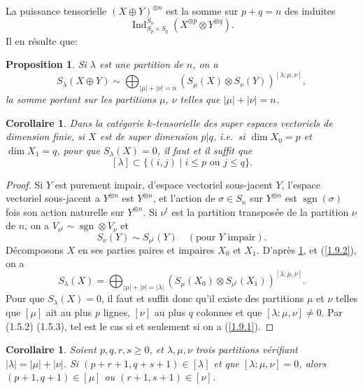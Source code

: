 \documentclass[11pt,a4paper]{article}
\theoremstyle{plain}
\newtheorem{proposition}[theorem]{Proposition}
\newtheorem{corollary}[theorem]{Corollaire}
\theoremstyle{definition}
\DeclareMathOperator{\Ind}{Ind}
\DeclareMathOperator{\sgn}{sgn}
\begin{document}
La puissance tensorielle $(X\oplus Y)^{\otimes n}$ est la somme sur $p+q=n$ des induites
\[
\Ind^{S_n}_{S_p\times S_q}(X^{\otimes p}\otimes Y^{\otimes q}).
\]
Il en r\'esulte que:

\begin{proposition}\label{1.8}
Si $\lambda$ est une partition de $n$, on a
\begin{equation}\label{1.8.1}
S_\lambda(X\oplus Y)\sim\bigoplus_{|\mu|+|\nu|=n}(S_\mu(X)\otimes S_\nu(Y))^{[\lambda:\mu,\nu]},
\end{equation}
la somme portant sur les partitions $\mu$, $\nu$ telles que $|\mu|+|\nu|=n$.
\end{proposition}

\begin{corollary}\label{1.9}
Dans la cat\'egorie $k$-tensorielle des super espaces vectoriels de dimension finie, si $X$ est de super dimension $p|q$, i.e.~si $\dim X_0=p$ et $\dim X_1=q$, pour que $S_\lambda(X)=0$, il faut et il suffit que
\begin{equation}\label{1.9.1}
[\lambda]\subset\{(i,j)\mid i\leq p\text{ ou }j\leq q\}.
\end{equation}
\end{corollary}

\begin{proof}
Si $Y$ est purement impair, d'espace vectoriel sous-jacent $Y$, l'espace vectoriel sous-jacent a $Y^{\otimes n}$ est $Y^{\otimes n}$, et l'action de $\sigma\in S_n$ sur $Y^{\otimes n}$ est $\sgn(\sigma)$ fois son action naturelle sur $Y^{\otimes n}$. Si $\nu^t$ est la partition transpos\'ee de la partition $\nu$ de $n$, on a $V_{\nu^t}\sim\sgn\otimes V_\nu$ et
\begin{equation}\label{1.9.2}
S_\nu(Y)\sim S_{\nu^t}(Y)\quad(\text{pour }Y\text{ impair}).
\end{equation}
D\'ecomposons $X$ en ses parties paires et impaires $X_0$ et $X_1$. D'apr\`es \ref{1.8}, et (\ref{1.9.2}), on a
\[
S_\lambda(X)=\bigoplus_{|\mu|+|\nu|=|\lambda|}(S_\mu(X_0)\otimes S_{\nu^t}(X_1))^{[\lambda:\mu,\nu]}.
\]
Pour que $S_\lambda(X)=0$, il faut et suffit donc qu'il existe des partitions $\mu$ et $\nu$ telles que $[\mu]$ ait au plus $p$ lignes, $[\nu]$ au plus $q$ colonnes et que $[\lambda:\mu,\nu]\neq0$. Par (1.5.2) (1.5.3), tel est le cas si et seulement si on a (\ref{1.9.1}).
\end{proof}

\begin{corollary}\label{1.10}
Soient $p,q,r,s\geq0$, et $\lambda,\mu,\nu$ trois partitions v\'erifiant $|\lambda|=|\mu|+|\nu|$. Si $(p+r+1,q+s+1)\in[\lambda]$ et que $[\lambda:\mu,\nu]=0$, alors $(p+1,q+1)\in[\mu]$ ou $(r+1,s+1)\in[\nu]$.
\end{corollary}
\end{document}
